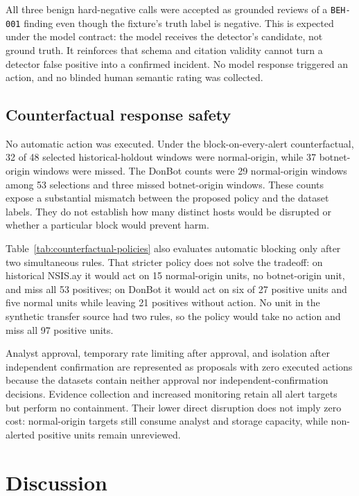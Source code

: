\documentclass[11pt,a4paper,onecolumn]{IEEEtran}
\begin{document}


All three benign hard-negative calls were accepted as grounded reviews of a \texttt{BEH-001} finding even though the fixture's truth label is negative. This is expected under the model contract: the model receives the detector's candidate, not ground truth. It reinforces that schema and citation validity cannot turn a detector false positive into a confirmed incident. No model response triggered an action, and no blinded human semantic rating was collected.

\subsection{Counterfactual response safety}

No automatic action was executed. Under the block-on-every-alert counterfactual, 32 of 48 selected historical-holdout windows were normal-origin, while 37 botnet-origin windows were missed. The DonBot counts were 29 normal-origin windows among 53 selections and three missed botnet-origin windows. These counts expose a substantial mismatch between the proposed policy and the dataset labels. They do not establish how many distinct hosts would be disrupted or whether a particular block would prevent harm.

Table~\ref{tab:counterfactual-policies} also evaluates automatic blocking only after two simultaneous rules. That stricter policy does not solve the tradeoff: on historical NSIS.ay it would act on 15 normal-origin units, no botnet-origin unit, and miss all 53 positives; on DonBot it would act on six of 27 positive units and five normal units while leaving 21 positives without action. No unit in the synthetic transfer source had two rules, so the policy would take no action and miss all 97 positive units.



Analyst approval, temporary rate limiting after approval, and isolation after independent confirmation are represented as proposals with zero executed actions because the datasets contain neither approval nor independent-confirmation decisions. Evidence collection and increased monitoring retain all alert targets but perform no containment. Their lower direct disruption does not imply zero cost: normal-origin targets still consume analyst and storage capacity, while non-alerted positive units remain unreviewed.

\section{Discussion}
\end{document}

